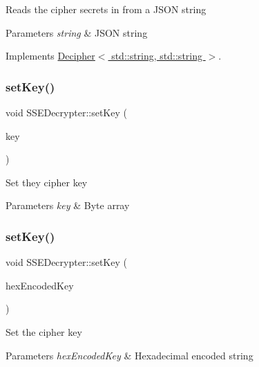 Reads the cipher secrets in from a J\+S\+ON string 
\begin{DoxyParams}{Parameters}
{\em string} & J\+S\+ON string \\
\hline
\end{DoxyParams}


Implements \hyperlink{classDecipher_a39aea002012130201e12a8fa7d84dda5}{Decipher$<$ std\+::string, std\+::string $>$}.

\mbox{\label{classSSEDecrypter_afb19d398b4862298a831a020d61ffef7}} 
\subsubsection{\texorpdfstring{set\+Key()}{setKey()}\hspace{0.1cm}{\footnotesize\ttfamily [1/2]}}
{\footnotesize\ttfamily void S\+S\+E\+Decrypter\+::set\+Key (\begin{DoxyParamCaption}\item[{Crypto\+P\+P\+::\+Sec\+Byte\+Block \&}]{key }\end{DoxyParamCaption})}

Set they cipher key 
\begin{DoxyParams}{Parameters}
{\em key} & Byte array \\
\hline
\end{DoxyParams}
\mbox{\label{classSSEDecrypter_a86d8cc2754814cfe59ee69ddf900b1f4}} 
\subsubsection{\texorpdfstring{set\+Key()}{setKey()}\hspace{0.1cm}{\footnotesize\ttfamily [2/2]}}
{\footnotesize\ttfamily void S\+S\+E\+Decrypter\+::set\+Key (\begin{DoxyParamCaption}\item[{std\+::string \&}]{hex\+Encoded\+Key }\end{DoxyParamCaption})}

Set the cipher key 
\begin{DoxyParams}{Parameters}
{\em hex\+Encoded\+Key} & Hexadecimal encoded string \\
\hline
\end{DoxyParams}


